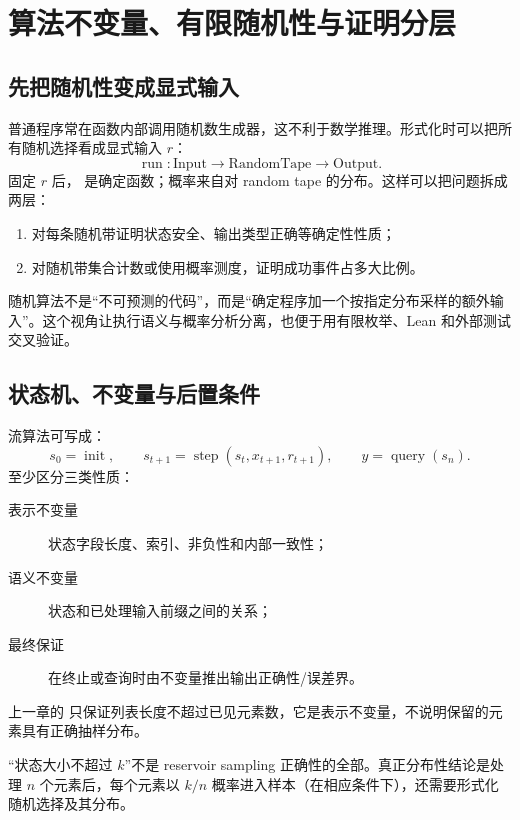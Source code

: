 \chapter{算法不变量、有限随机性与证明分层}

\section{先把随机性变成显式输入}

普通程序常在函数内部调用随机数生成器，这不利于数学推理。形式化时可以把所有随机选择看成显式输入 $r$：
\[
\operatorname{run}:\mathrm{Input}\to\mathrm{RandomTape}\to\mathrm{Output}.
\]
固定 $r$ 后， 是确定函数；概率来自对 random tape 的分布。这样可以把问题拆成两层：
\begin{enumerate}
  \item 对每条随机带证明状态安全、输出类型正确等确定性性质；
  \item 对随机带集合计数或使用概率测度，证明成功事件占多大比例。
\end{enumerate}

\begin{intuitionbox}
随机算法不是“不可预测的代码”，而是“确定程序加一个按指定分布采样的额外输入”。这个视角让执行语义与概率分析分离，也便于用有限枚举、Lean 和外部测试交叉验证。
\end{intuitionbox}

\section{状态机、不变量与后置条件}

流算法可写成：
\[
s_0=\operatorname{init},\qquad
s_{t+1}=\operatorname{step}(s_t,x_{t+1},r_{t+1}),\qquad
y=\operatorname{query}(s_n).
\]
至少区分三类性质：
\begin{description}
  \item[表示不变量] 状态字段长度、索引、非负性和内部一致性；
  \item[语义不变量] 状态和已处理输入前缀之间的关系；
  \item[最终保证] 在终止或查询时由不变量推出输出正确性/误差界。
\end{description}

上一章的  只保证列表长度不超过已见元素数，它是表示不变量，不说明保留的元素具有正确抽样分布。

\begin{warningbox}
“状态大小不超过 $k$”不是 reservoir sampling 正确性的全部。真正分布性结论是处理 $n$ 个元素后，每个元素以 $k/n$ 概率进入样本（在相应条件下），还需要形式化随机选择及其分布。
\end{warningbox}

